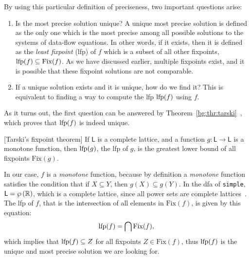 By using this particular definition of preciseness, two important questions
arise:
\begin{enumerate}

    \item Is the most precise solution unique?  A unique most precise solution
    is defined as the only one which is the most precise among all possible
    solutions to the systems of data-flow equations.  In other words, if
    it exists, then it is defined as the \emph{least fixpoint} (\gls{lfp}) of
    $f$ which is a subset of all other fixpoints, \ie~$\operatorname{\mathrm{lfp}} (f) \subseteq
    \mathrm{Fix}(f)$.  As we have discussed earlier, multiple fixpoints exist,
    and it is possible that these fixpoint solutions are not comparable.

    \item If a unique solution exists and it is unique, how do we find it?
    This is equivalent to finding a way to compute the \gls{lfp} $\operatorname{\mathrm{lfp}}(f)$
    using $f$.

\end{enumerate}

As it turns out, the first question can be answered by
Theorem~\ref{bg:thr:tarski}~\cite{tarski55, nielson99}, which proves that $\operatorname{\mathrm{lfp}}
(f)$ is indeed unique.
\begin{theorem}
    \textup{[Tarski's fixpoint theorem]}
    If $\mathsf{L}$ is a complete lattice\footnotemark[2], and a function
    $g: \mathsf{L} \to \mathsf{L}$ is a monotone function, then $\operatorname{\mathrm{lfp}}(g)$,
    the \gls{lfp} of $g$, is the greatest lower bound of all fixpoints
    $\mathrm{Fix}(g)$.\label{bg:thr:tarski}
\end{theorem}

In our case, $f$ is a \emph{monotone} function, because by definition a
\emph{monotone} function satisfies the condition that if $X \subseteq Y$,
then $g(X) \subseteq g(Y)$.  In the \gls{dfa} of \verb|simple|, $\mathsf{L}
= \wp\left({\mathbb{R}}\right)$, which is a complete lattice, since all power sets
are complete lattices~\cite{nielson99}.  The \gls{lfp} of $f$, that is the
intersection of all elements in $\mathrm{Fix}(f)$, is given by this equation:
\begin{equation}
    \operatorname{\mathrm{lfp}} (f) = \bigcap \mathrm{Fix}(f),
\end{equation}
which implies that $\operatorname{\mathrm{lfp}} (f) \subseteq Z$ for all fixpoints $Z \in
\mathrm{Fix}(f)$, thus $\operatorname{\mathrm{lfp}} (f)$ is the unique and most precise solution we
are looking for.


